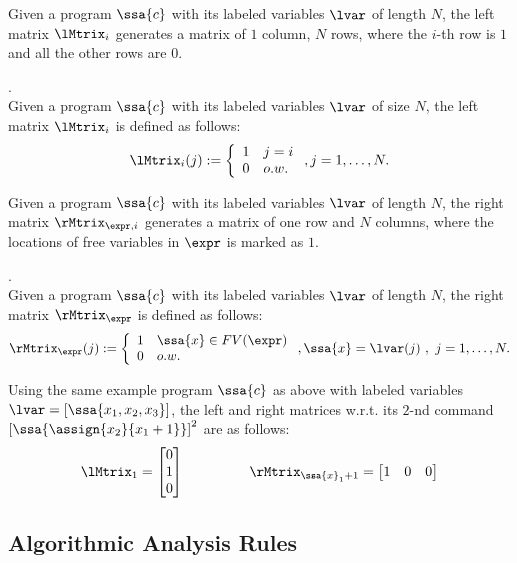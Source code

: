 Given a program  $\ssa{c}$ with its labeled variables $\lvar$ of length $N$,
the left matrix $\lMtrix_i$ generates a matrix of $1$ column, $N$ rows, 
where the $i$-th row is $1$ and all the other rows are $0$.
%
\begin{defn}.
\\
Given a program  $\ssa{c}$ with its labeled variables $\lvar$ of size $N$, 
the left matrix $\lMtrix_i$ is defined as follows:
\[
\lMtrix_i(j) : = 
\left
\{
\begin{array}{ll}
1 & j = i \\
0 & o.w.
\end{array}
\right.,
j = 1, \ldots, N.
\]
\end{defn}
%
Given a program  $\ssa{c}$ with its labeled variables $\lvar$ of length $N$,
the right matrix $\rMtrix_{\expr, i}$ generates a matrix of one row and $N$ columns, 
where the locations of free variables in $\expr$ is marked as $1$. 
%
%
\begin{defn}.
\\
Given a program  $\ssa{c}$ with its labeled variables $\lvar$ of length $N$, 
the right matrix $\rMtrix_{\expr}$ is defined as follows:
\[
\rMtrix_{\expr}(j) : = 
\left\{
\begin{array}{ll}
1 & \ssa{x} \in FV(\expr) 
\\
0 & o.w.
\end{array}
\right.,
\ssa{x} = \lvar(j) ~ , ~ j = 1, \ldots, N.
\]
%
%
\end{defn}
%
Using the same example program $\ssa{c}$ as above with labeled variables $\lvar = [ \ssa{x_1 , x_2 , x_3} ] $,
the left and right matrices w.r.t. its $2$-nd command 
$\left[\ssa{\assign {x_2} {x_1 + 1}}\right]^2$  are as follows:
\[
\lMtrix_1 = \left[ \begin{matrix}
0   \\
1 	 \\
0   \\
\end{matrix}   \right ] 
~~~~~~~~~~~~~~
\rMtrix_{\ssa{x}_1 + 1}
= \left[ \begin{matrix} 
1 & 0 & 0 \\
\end{matrix}  \right]
\]
%
%
%
\subsection{Algorithmic Analysis Rules}
%
